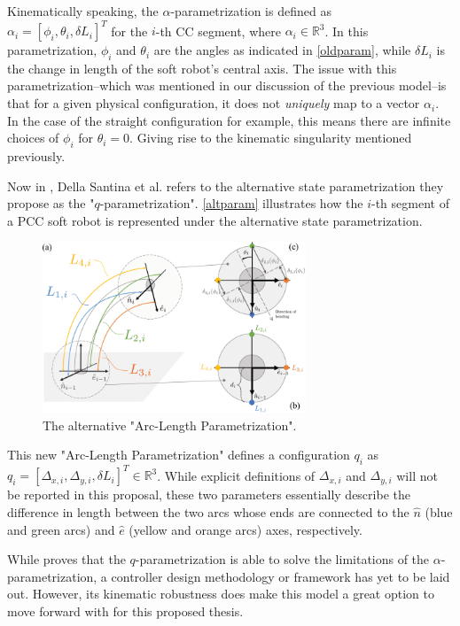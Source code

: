 Kinematically speaking, the $\alpha$-parametrization is defined as \\
$\alpha_i = [\phi_i, \theta_i,\delta L_i]^T$ for the $i$-th CC segment, 
where $\alpha_i \in \mathbb{R}^3$. In this parametrization, $\phi_i$ and $\theta_i$ are the angles as indicated in \autoref{oldparam}, while $\delta L_i$ is the change in length of the soft robot's central axis. The issue with this parametrization--which was mentioned in our discussion of the previous model--is that for a given physical configuration, it does not \textit{uniquely} map to a vector $\alpha_i$. In the case of the straight configuration for example, this means there are infinite choices of $\phi_i$ for $\theta_i=0$. Giving rise to the kinematic singularity mentioned previously.

Now in \cite{della_santina_improved_2020}, Della Santina et al. refers to the alternative state parametrization they propose as the "$q$-parametrization". \autoref{altparam} illustrates how the $i$-th segment of a PCC soft robot is represented under the alternative state parametrization.

\begin{figure}[h!]
    \centering
    \includegraphics[width=0.7\textwidth]{graphics/altparam.png}
    \caption{The alternative "Arc-Length Parametrization". }
    \label{altparam}
\end{figure}

This new "Arc-Length Parametrization" defines a configuration $q_i$ as $q_i = [\Delta_{x,i}, \Delta_{y,i}, \delta L_i]^T \in \mathbb{R}^3$. While explicit definitions of $\Delta_{x,i}$ and $\Delta_{y,i}$ will not be reported in this proposal, these two parameters essentially describe the difference in length between the two arcs whose ends are connected to the $\hat{n}$ (blue and green arcs) and $\hat{e}$ (yellow and orange arcs) axes, respectively.

While \cite{della_santina_improved_2020} proves that the $q$-parametrization is able to solve the limitations of the $\alpha$-parametrization, a controller design methodology or framework has yet to be laid out. However, its kinematic robustness does make this model a great option to move forward with for this proposed thesis.        